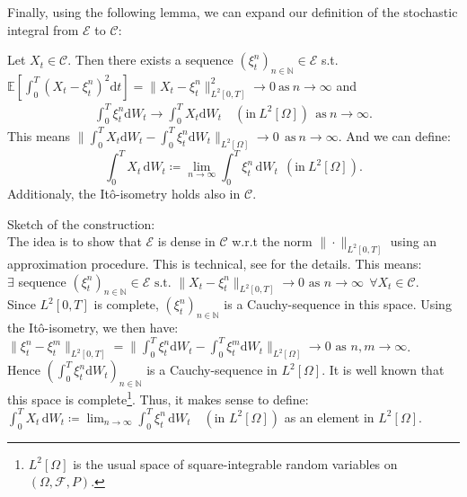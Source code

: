 Finally, using the following lemma, we can expand our definition of the stochastic integral from \(\mathcal{E}\) to \(\mathcal{C}\):
\begin{lemma}
Let \(X_t\in\mathcal{C}\). Then there exists a sequence \(({\xi_{t}^n})_{n\!\in\!\mathbb{N}}\in\mathcal{E}\) s.t.
\(\mathbb{E}[\int_{0}^{T}(X_t-\xi_{t}^n)^2\mathrm{d}t] = \|X_t-\xi_{t}^n\|^2_{L^2[0,T]}\rightarrow 0\:\text{as}\:n\rightarrow\infty\) and 
\begin{align*}
\int_{0}^{T}\xi_t^n\mathrm{d}W_t\rightarrow\int_{0}^{T}X_t\mathrm{d}W_t\quad(\text{in}\:L^2[\Omega])\:\:\text{as}\:n\rightarrow\infty.
\end{align*}
This means \(\|\int_{0}^{T}X_t\mathrm{d}W_t-\int_{0}^{T}\xi_t^n\mathrm{d}W_t\|_{L^2[\Omega]} \rightarrow 0\:\:\text{as}\:n\rightarrow\infty.\)
And we can define:
\[\int_0^T\! X_t\,\mathrm{d}W_{t} \coloneqq\lim_{n\to\infty}\int_0^T\! \xi_t^n\,\mathrm{d}W_{t}  \:\:(\text{in}\:L^2[\Omega]).\]
Additionaly, the It\^o-isometry holds also in \(\mathcal{C}\).
\end{lemma}

Sketch of the construction:\\
The idea is to show that \(\mathcal{E}\) is dense in \(\mathcal{C}\) w.r.t the norm \(\|\cdot\|_{L^2[0,T]}\) using an approximation procedure. This is technical, see \cite{Oksendal} for the details.
This means:\\
\(\exists\) sequence \((\xi_t^n)_{n\!\in\!\mathbb{N}}\in\mathcal{E} \text{ s.t. } \|X_t-\xi_t^n\|_{L^2[0,T]}\rightarrow 0 \text{ as } n\rightarrow\infty\:\:\forall X_t\in\mathcal{C}\).\\
Since \( L^2[0,T]\) is complete, \(({\xi_t^n})_{n\!\in\!\mathbb{N}}\) is a Cauchy-sequence in this space. Using the It\^o-isometry, we then have:\\
\(\|\xi_t^n-\xi_t^m\|_{L^2[0,T]} = \|\int_{0}^{T}\xi_t^n\mathrm{d}W_t-\int_{0}^{T}\xi_t^m\mathrm{d}W_t\|_{L^2[\Omega]}\rightarrow 0 \text{ as } n,m\rightarrow\infty\). \\
Hence \(({\int_{0}^{T}\xi_t^n}\mathrm{d}W_t)_{n\!\in\!\mathbb{N}}\) is a Cauchy-sequence in \(L^2[\Omega]\). It is well known that this space is complete\footnote{\(L^2[\Omega]\) is the usual space of square-integrable random variables on
\(\left( \Omega , \mathcal{F}, P\right)\).}. 
Thus, it makes sense to define:\\
\(\int_0^T\! X_t\,\mathrm{d}W_{t} \coloneqq\lim_{n\to\infty}\int_0^T\! \xi_t^n\,\mathrm{d}W_{t} \quad(\text{in }L^2[\Omega])\) as an element in \(L^2[\Omega]\).

